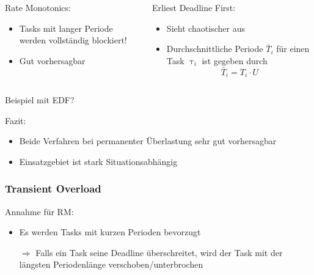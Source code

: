 \begin{frame}{\subsubsecname}
	\begin{columns}[]
  			\begin{column}{0.5\textwidth}
				Rate Monotonics:
				\begin{itemize}
					\item Tasks mit langer Periode werden vollständig blockiert!
					\item Gut vorhersagbar
				\end{itemize}

			\end{column}
  			\begin{column}{0.5\textwidth}
  				Erliest Deadline First:
				\begin{itemize}
					\item Sieht chaotischer aus
					\item Durchschnittliche Periode $\bar{T}_i$ für einen Task $\uptau_i$ ist gegeben durch
						\begin{equation}
							\bar{T}_i=T_i\cdot U
						\end{equation}
				\end{itemize}	
  			\end{column}
	\end{columns}
\end{frame}

\begin{frame}{\subsubsecname}
	Beispiel mit EDF? %
\end{frame}

\begin{frame}{\subsubsecname}
	Fazit:
	\begin{itemize}
		\item Beide Verfahren bei permanenter Überlastung sehr gut vorhersagbar
		\item Einsatzgebiet ist stark Situationsabhängig
	\end{itemize}
\end{frame}

\subsubsection{Transient Overload}
\begin{frame}{\subsubsecname}
	Annahme für RM:
	\begin{itemize}
		\item Es werden Tasks mit kurzen Perioden bevorzugt\pause
		\item[$\Rightarrow$] Falls ein Task seine Deadline überschreitet, wird der Task mit der längsten Periodenlänge verschoben/unterbrochen	
	\end{itemize}
\end{frame}

